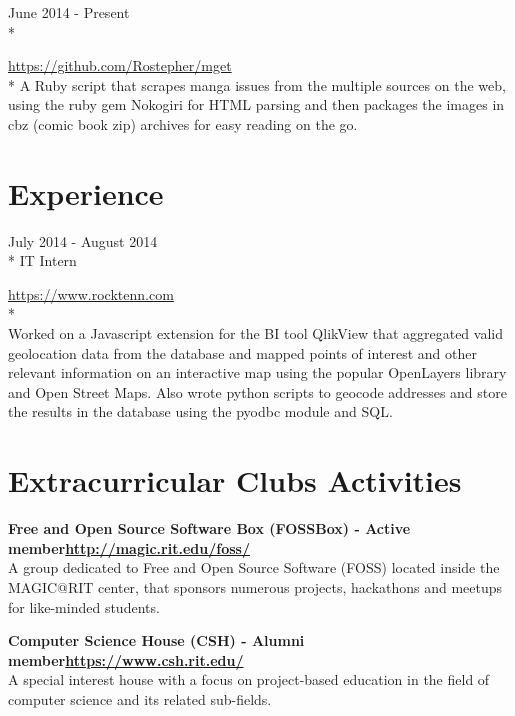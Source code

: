 \documentclass[a4paper,margin,line]{resume}
\newcommand{\rurl}[1]{\hfill {\footnotesize \url{#1}}}
\newcommand{\rdate}[1]{\hfill {\small #1}}
\newcommand{\rproject}[3]{\item[#1] \hfill \rdate{#2} \\* \strut\hfill \rurl{#3} \\*}
\newcommand{\remployer}[4]{\item[#1] \hfill \rdate{#2} \\* \hfill \rdate{#3} \strut\hfill \rurl{#4} \\*}
\begin{document}
\begin{resume}
\begin{asparadesc}
        \rproject{mget}{June 2014 - Present}{https://github.com/Rostepher/mget}
        \small
        A Ruby script that scrapes manga issues from the multiple sources on the web, using the ruby gem Nokogiri for HTML parsing and then packages the images in cbz (comic book zip) archives for easy reading on the go.
        \normalsize
        \\
    \end{asparadesc}

\section{\mysidestyle Experience}
	\begin{asparadesc}
        \remployer{RockTenn}{July 2014 - August 2014}{IT Intern}{https://www.rocktenn.com}
        \\
        \small
        Worked on a Javascript extension for the BI tool QlikView that aggregated valid geolocation data from the database and mapped points of interest and other relevant information on an interactive map using the popular OpenLayers library and Open Street Maps. Also wrote python scripts to geocode addresses and store the results in the database using the pyodbc module and SQL.
        \normalsize
	\end{asparadesc}

\section{\mysidestyle Extracurricular Clubs Activities}
	\begin{asparablank}
    \item{\bf{}Free and Open Source Software Box ({\small FOSSBox}) - {\small Active member}\rurl{http://magic.rit.edu/foss/}}
    \\
    A group dedicated to Free and Open Source Software (FOSS) located inside the MAGIC@RIT center, that sponsors numerous projects, hackathons and meetups for like-minded students.
    \\

    \item{\bf{}Computer Science House ({\small CSH}) - {\small Alumni member}\rurl{https://www.csh.rit.edu/}}
    \\
    A special interest house with a focus on project-based education in the field of computer science and its related sub-fields.
	\end{asparablank}
\end{resume}
\end{document}
